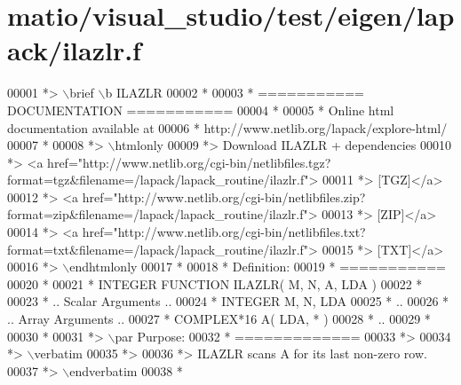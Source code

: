 \hypertarget{matio_2visual__studio_2test_2eigen_2lapack_2ilazlr_8f_source}{}\section{matio/visual\+\_\+studio/test/eigen/lapack/ilazlr.f}
\label{matio_2visual__studio_2test_2eigen_2lapack_2ilazlr_8f_source}

\begin{DoxyCode}
00001 \textcolor{comment}{*> \(\backslash\)brief \(\backslash\)b ILAZLR}
00002 \textcolor{comment}{*}
00003 \textcolor{comment}{*  =========== DOCUMENTATION ===========}
00004 \textcolor{comment}{*}
00005 \textcolor{comment}{* Online html documentation available at }
00006 \textcolor{comment}{*            http://www.netlib.org/lapack/explore-html/ }
00007 \textcolor{comment}{*}
00008 \textcolor{comment}{*> \(\backslash\)htmlonly}
00009 \textcolor{comment}{*> Download ILAZLR + dependencies }
00010 \textcolor{comment}{*> <a
       href="http://www.netlib.org/cgi-bin/netlibfiles.tgz?format=tgz&filename=/lapack/lapack\_routine/ilazlr.f"> }
00011 \textcolor{comment}{*> [TGZ]</a> }
00012 \textcolor{comment}{*> <a
       href="http://www.netlib.org/cgi-bin/netlibfiles.zip?format=zip&filename=/lapack/lapack\_routine/ilazlr.f"> }
00013 \textcolor{comment}{*> [ZIP]</a> }
00014 \textcolor{comment}{*> <a
       href="http://www.netlib.org/cgi-bin/netlibfiles.txt?format=txt&filename=/lapack/lapack\_routine/ilazlr.f"> }
00015 \textcolor{comment}{*> [TXT]</a>}
00016 \textcolor{comment}{*> \(\backslash\)endhtmlonly }
00017 \textcolor{comment}{*}
00018 \textcolor{comment}{*  Definition:}
00019 \textcolor{comment}{*  ===========}
00020 \textcolor{comment}{*}
00021 \textcolor{comment}{*       INTEGER FUNCTION ILAZLR( M, N, A, LDA )}
00022 \textcolor{comment}{* }
00023 \textcolor{comment}{*       .. Scalar Arguments ..}
00024 \textcolor{comment}{*       INTEGER            M, N, LDA}
00025 \textcolor{comment}{*       ..}
00026 \textcolor{comment}{*       .. Array Arguments ..}
00027 \textcolor{comment}{*       COMPLEX*16         A( LDA, * )}
00028 \textcolor{comment}{*       ..}
00029 \textcolor{comment}{*  }
00030 \textcolor{comment}{*}
00031 \textcolor{comment}{*> \(\backslash\)par Purpose:}
00032 \textcolor{comment}{*  =============}
00033 \textcolor{comment}{*>}
00034 \textcolor{comment}{*> \(\backslash\)verbatim}
00035 \textcolor{comment}{*>}
00036 \textcolor{comment}{*> ILAZLR scans A for its last non-zero row.}
00037 \textcolor{comment}{*> \(\backslash\)endverbatim}
00038 \textcolor{comment}{*}

\end{DoxyCode}
